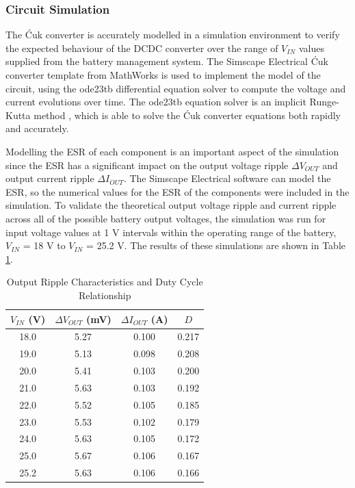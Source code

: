 \subsubsection{Circuit Simulation}

The Ćuk converter is accurately modelled in a simulation environment to verify the expected behaviour of the \acrshort{DCDC} converter over the range of $V_{IN}$ values supplied from the battery management system. The Simscape Electrical Ćuk converter template from MathWorks is used to implement the model of the circuit, using the ode23tb differential equation solver to compute the voltage and current evolutions over time. The ode23tb equation solver is an implicit Runge-Kutta method \cite{matlab_ode23tb}, which is able to solve the Ćuk converter equations both rapidly and accurately.

Modelling the \gls{ESR} of each component is an important aspect of the simulation since the \acrshort{ESR} has a significant impact on the output voltage ripple $\Delta V_{OUT}$ and output current ripple $\Delta I_{OUT}$. The Simscape Electrical software can model the \acrshort{ESR}, so the numerical values for the \acrshort{ESR} of the components were included in the simulation. To validate the theoretical output voltage ripple and current ripple across all of the possible battery output voltages, the simulation was run for input voltage values at 1 V intervals within the operating range of the battery, $V_{IN}$ = 18 V to $V_{IN}$ = 25.2 V. The results of these simulations are shown in Table \ref{tab:converter_performance}.

\begin{table}[h]
    \centering
    \renewcommand{\arraystretch}{1.2}
    \begin{tabular}{cccc}
        \toprule
        $V_{IN}$ (V) & $\Delta V_{OUT}$ (mV) & $\Delta I_{OUT}$ (A) & $D$ \\
        \midrule
        18.0 & 5.27 & 0.100 & 0.217 \\
        19.0 & 5.13 & 0.098 & 0.208 \\
        20.0 & 5.41 & 0.103 & 0.200 \\
        21.0 & 5.63 & 0.103 & 0.192 \\
        22.0 & 5.52 & 0.105 & 0.185 \\
        23.0 & 5.53 & 0.102 & 0.179 \\
        24.0 & 5.63 & 0.105 & 0.172 \\
        25.0 & 5.67 & 0.106 & 0.167 \\
        25.2 & 5.63 & 0.106 & 0.166 \\
        \bottomrule
    \end{tabular}
    \caption{Output Ripple Characteristics and Duty Cycle Relationship}
    \label{tab:converter_performance}
\end{table}


